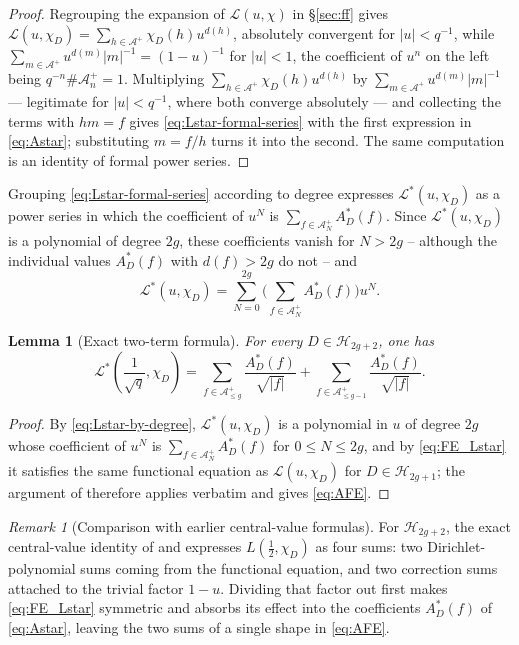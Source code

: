 \documentclass[a4paper,reqno]{amsart}
\numberwithin{equation}{section}
\newtheorem{lemma}[theorem]{Lemma}
\theoremstyle{remark}
\newtheorem{remark}[theorem]{Remark}
\theoremstyle{definition}
\newcommand{\A}{\mathcal{A}}
\begin{document}
\begin{proof}
Regrouping the expansion of $\mathcal L(u,\chi)$ in \S\ref{sec:ff} gives
$\mathcal L(u,\chi_D)=\sum_{h\in\A^+}\chi_D(h)u^{d(h)}$, absolutely
convergent for $|u|<q^{-1}$, while
$\sum_{m\in\A^+}u^{d(m)}|m|^{-1}=(1-u)^{-1}$ for $|u|<1$, the coefficient of
$u^n$ on the left being $q^{-n}\#\A_n^+=1$. Multiplying
$\sum_{h\in\A^+}\chi_D(h)u^{d(h)}$ by $\sum_{m\in\A^+}u^{d(m)}|m|^{-1}$ ---
legitimate for $|u|<q^{-1}$, where both converge absolutely --- and
collecting the terms with $hm=f$ gives \eqref{eq:Lstar-formal-series} with the first expression
in \eqref{eq:Astar}; substituting $m=f/h$ turns it into the second. The same
computation is an identity of formal power series.
\end{proof}

Grouping \eqref{eq:Lstar-formal-series} according to degree expresses
$\mathcal L^*(u,\chi_D)$ as a power series in which the coefficient of $u^N$
is $\sum_{f\in\A_N^+}A_D^*(f)$. Since $\mathcal L^*(u,\chi_D)$ is a
polynomial of degree $2g$, these coefficients vanish for $N>2g$ -- although
the individual values $A_D^*(f)$ with $d(f)>2g$ do not -- and
\begin{equation}\label{eq:Lstar-by-degree}
\mathcal L^*(u,\chi_D)
=
\sum_{N=0}^{2g}
\Biggl(
\sum_{f\in\A_N^+}A_D^*(f)
\Biggr)u^N.
\end{equation}

\begin{lemma}[Exact two-term formula]\label{lem:AFE}
For every $D\in\mathcal H_{2g+2}$, one has
\begin{equation}\label{eq:AFE}
\mathcal L^*\!\left(\frac{1}{\sqrt q},\chi_D\right)
=
\sum_{f\in\A^+_{\le g}}
\frac{A_D^*(f)}{\sqrt{|f|}}
+
\sum_{f\in\A^+_{\le g-1}}
\frac{A_D^*(f)}{\sqrt{|f|}}.
\end{equation}
\end{lemma}

\begin{proof}
By \eqref{eq:Lstar-by-degree}, $\mathcal L^*(u,\chi_D)$ is a polynomial in
$u$ of degree $2g$ whose coefficient of $u^N$ is
$\sum_{f\in\A_N^+}A_D^*(f)$ for $0\le N\le2g$, and by \eqref{eq:FE_Lstar}
it satisfies the same functional equation as $\mathcal L(u,\chi_D)$ for
$D\in\mathcal H_{2g+1}$; the argument of \cite[Lemma~3.3]{AK12} therefore
applies verbatim and gives \eqref{eq:AFE}.
\end{proof}

\begin{remark}[Comparison with earlier central-value formulas]
\label{rem:four-sums}
For $\mathcal H_{2g+2}$, the exact central-value identity of
\cite[Lemma~2.1]{Ju20} and \cite[Lemma~2.4]{AM-21} expresses
$L(\tfrac12,\chi_D)$ as four sums: two Dirichlet-polynomial sums
coming from the functional equation, and two correction sums attached to the
trivial factor $1-u$. Dividing that factor out first makes
\eqref{eq:FE_Lstar} symmetric and absorbs its effect into the coefficients
$A_D^*(f)$ of \eqref{eq:Astar}, leaving the two sums of a single shape in
\eqref{eq:AFE}.
\end{remark}
\end{document}
